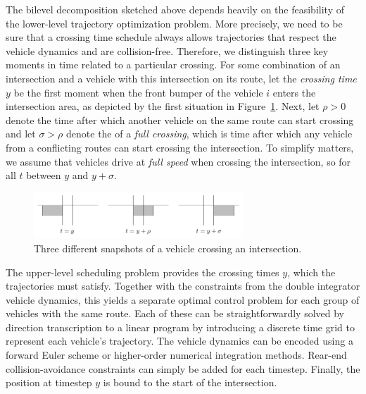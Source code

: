 \documentclass{article}
\theoremstyle{definition}
\theoremstyle{plain}
\begin{document}
The bilevel decomposition sketched above depends heavily on the feasibility of
the lower-level trajectory optimization problem. More precisely, we need to be
sure that a crossing time schedule always allows trajectories that respect the
vehicle dynamics and are collision-free.
Therefore, we distinguish three key moments in time related to a particular
crossing. For some combination of an intersection and a vehicle with this
intersection on its route, let the \textit{crossing time} $y$ be the first
moment when the front bumper of the vehicle $i$ enters the intersection area, as
depicted by the first situation in Figure~\ref{fig:vehicle_crossing}. Next, let
$\rho > 0$ denote the time after which another vehicle on the same route can
start crossing and let $\sigma > \rho$ denote the of a \textit{full crossing},
which is time after which any vehicle from a conflicting routes can start
crossing the intersection.
To simplify matters, we assume that vehicles drive at \textit{full speed} when crossing
the intersection, so for all $t$ between $y$ and $y + \sigma$.

\begin{figure}[h]
  \centering
  \includegraphics[width=0.7\textwidth]{figures/vehicle_crossing.pdf}
  \caption{Three different snapshots of a vehicle crossing an intersection.}
  \label{fig:vehicle_crossing}
\end{figure}

The upper-level scheduling problem provides the crossing times $y$,
which the trajectories must satisfy. Together with the constraints from the
double integrator vehicle dynamics, this yields a separate optimal control
problem for each group of vehicles with the same route.
Each of these can be straightforwardly solved by direction transcription to a
linear program by introducing a discrete time grid to represent each vehicle's
trajectory. The vehicle dynamics can be encoded using a forward Euler scheme or
higher-order numerical integration methods. Rear-end collision-avoidance
constraints can simply be added for each timestep. Finally, the position at
timestep $y$ is bound to the start of the intersection.
\end{document}
